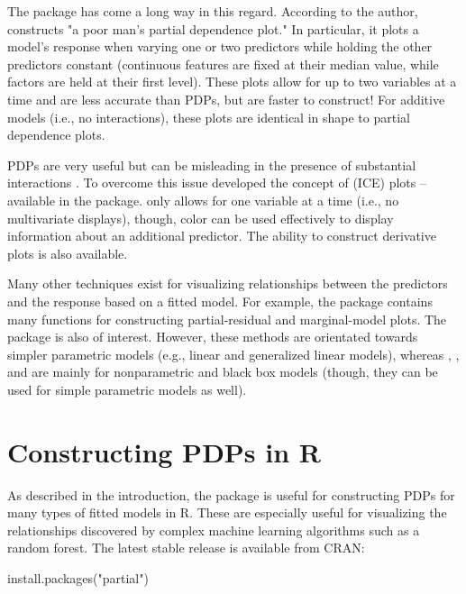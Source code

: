 The  package \citep{plotmo-pkg} has come a long way in this regard. According to the author,  constructs "a poor man's partial dependence plot." In particular, it plots a model's response when varying one or two predictors while holding the other predictors constant (continuous features are fixed at their median value, while factors are held at their first level). These plots allow for up to two variables at a time and are less accurate than PDPs, but are faster to construct! For additive models (i.e., no interactions), these plots are identical in shape to partial dependence plots.

PDPs are very useful but can be misleading in the presence of substantial interactions \citep{goldstein-peeking-2015}. To overcome this issue \citeauthor*{goldstein-peeking-2015} developed the concept of  (ICE) plots -- available in the  package.  only allows for one variable at a time (i.e., no multivariate displays), though, color can be used effectively to display information about an additional predictor. The ability to construct derivative plots is also available.

Many other techniques exist for visualizing relationships between the predictors and the response based on a fitted model. For example, the  package \citep{fox-car-2011} contains many functions for constructing partial-residual and marginal-model plots. The  package \citep{fox-effects-2003} is also of interest. However, these methods are orientated towards simpler parametric models (e.g., linear and generalized linear models), whereas , , and  are mainly for nonparametric and black box models (though, they can be used for simple parametric models as well). 


\section{Constructing PDPs in R}

As described in the introduction, the  package is useful for constructing PDPs for many types of fitted models in R. These are especially useful for visualizing the relationships discovered by complex machine learning algorithms such as a random forest. The latest stable release is available from CRAN:
\begin{example}
install.packages("partial")
\end{example}


